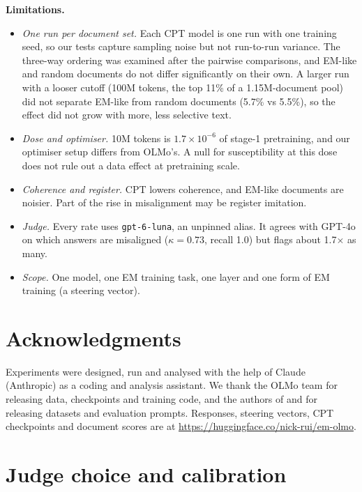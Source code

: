\documentclass{article}
\begin{document}
\textbf{Limitations.}
\begin{itemize}[leftmargin=1.2em, itemsep=1pt]
  \item \emph{One run per document set.} Each CPT model is one run with one training seed, so our tests capture sampling
  noise but not run-to-run variance. The three-way ordering was examined after the pairwise comparisons, and EM-like and
  random documents do not differ significantly on their own. A larger run with a looser cutoff (100M tokens, the top 11\%
  of a 1.15M-document pool) did not separate EM-like from random documents (5.7\% vs 5.5\%), so the effect did not grow
  with more, less selective text.
  \item \emph{Dose and optimiser.} 10M tokens is $1.7\times10^{-6}$ of stage-1 pretraining, and our optimiser setup differs
  from OLMo's. A null for susceptibility at this dose does not rule out a data effect at pretraining scale.
  \item \emph{Coherence and register.} CPT lowers coherence, and EM-like documents are noisier. Part of the rise in
  misalignment may be register imitation.
  \item \emph{Judge.} Every rate uses \texttt{gpt-6-luna}, an unpinned alias. It agrees with GPT-4o on which answers are
  misaligned ($\kappa=0.73$, recall 1.0) but flags about 1.7$\times$ as many.
  \item \emph{Scope.} One model, one EM training task, one layer and one form of EM training (a steering vector).
\end{itemize}

\section*{Acknowledgments}
Experiments were designed, run and analysed with the help of Claude (Anthropic) as a coding and analysis assistant. We
thank the OLMo team for releasing data, checkpoints and training code, and the authors of \citet{turner2025model} and
\citet{soligo2026easy} for releasing datasets and evaluation prompts. Responses, steering vectors, CPT checkpoints and
document scores are at \url{https://huggingface.co/nick-rui/em-olmo}.




\newpage
\appendix

\section{Judge choice and calibration}\label{app:judge}
\end{document}
